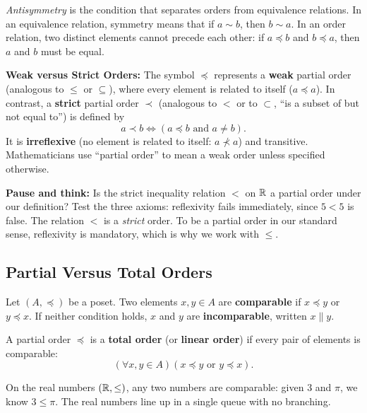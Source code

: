 \begin{intuitionbox}
\emph{Antisymmetry} is the condition that separates orders from equivalence relations. In an equivalence relation, symmetry means that if $a \sim b$, then $b \sim a$. In an order relation, two distinct elements cannot precede each other: if $a \preceq b$ and $b \preceq a$, then $a$ and $b$ must be equal.
\end{intuitionbox}

\begin{marginnotebox}
\textbf{Weak versus Strict Orders:} The symbol $\preceq$ represents a \textbf{weak} partial order (analogous to $\le$ or $\subseteq$), where every element is related to itself ($a \preceq a$). In contrast, a \textbf{strict} partial order $\prec$ (analogous to $<$ or to $\subset$, ``is a subset of but not equal to'') is defined by
\[
a \prec b \iff (a \preceq b \text{ and } a \neq b).
\]
It is \textbf{irreflexive} (no element is related to itself: $a \not\prec a$) and transitive. Mathematicians use ``partial order'' to mean a weak order unless specified otherwise.
\end{marginnotebox}

\begin{recoverybox}
\textbf{Pause and think:} Is the strict inequality relation $<$ on $\mathbb{R}$ a partial order under our definition? Test the three axioms: reflexivity fails immediately, since $5 < 5$ is false. The relation $<$ is a \emph{strict} order. To be a partial order in our standard sense, reflexivity is mandatory, which is why we work with $\le$.
\end{recoverybox}

\subsection{Partial Versus Total Orders}

\begin{definition}
Let $(A, \preceq)$ be a poset. Two elements $x, y \in A$ are \textbf{comparable} if $x \preceq y$ or $y \preceq x$. If neither condition holds, $x$ and $y$ are \textbf{incomparable}, written $x \parallel y$.

A partial order $\preceq$ is a \textbf{total order} (or \textbf{linear order}) if every pair of elements is comparable:
\[
(\forall x, y \in A)(x \preceq y \text{ or } y \preceq x).
\]
\end{definition}

On the real numbers $(\mathbb{R}, \le)$, any two numbers are comparable: given $3$ and $\pi$, we know $3 \le \pi$. The real numbers line up in a single queue with no branching.

